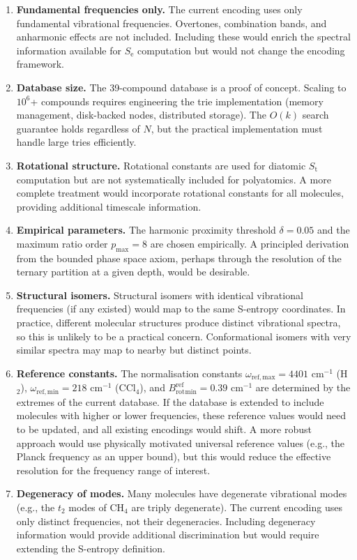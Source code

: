 \documentclass[11pt,twocolumn,a4paper]{article}
\theoremstyle{definition}
\theoremstyle{remark}
\newcommand{\St}{S_{\mathrm{t}}}
\newcommand{\Se}{S_{\mathrm{e}}}
\newcommand{\Brot}{B_{\mathrm{rot}}}
\begin{document}
\begin{enumerate}
\item \textbf{Fundamental frequencies only.} The current encoding uses only fundamental vibrational frequencies. Overtones, combination bands, and anharmonic effects are not included. Including these would enrich the spectral information available for $\Se$ computation but would not change the encoding framework.

\item \textbf{Database size.} The 39-compound database is a proof of concept. Scaling to $10^6$+ compounds requires engineering the trie implementation (memory management, disk-backed nodes, distributed storage). The $O(k)$ search guarantee holds regardless of $N$, but the practical implementation must handle large tries efficiently.

\item \textbf{Rotational structure.} Rotational constants are used for diatomic $\St$ computation but are not systematically included for polyatomics. A more complete treatment would incorporate rotational constants for all molecules, providing additional timescale information.

\item \textbf{Empirical parameters.} The harmonic proximity threshold $\delta = 0.05$ and the maximum ratio order $p_{\max} = 8$ are chosen empirically. A principled derivation from the bounded phase space axiom, perhaps through the resolution of the ternary partition at a given depth, would be desirable.

\item \textbf{Structural isomers.} Structural isomers with identical vibrational frequencies (if any existed) would map to the same S-entropy coordinates. In practice, different molecular structures produce distinct vibrational spectra, so this is unlikely to be a practical concern. Conformational isomers with very similar spectra may map to nearby but distinct points.

\item \textbf{Reference constants.} The normalisation constants $\omega_{\mathrm{ref,max}} = 4401$ cm$^{-1}$ (H$_2$), $\omega_{\mathrm{ref,min}} = 218$ cm$^{-1}$ (CCl$_4$), and $\Brot^{\mathrm{ref}}_{\mathrm{min}} = 0.39$ cm$^{-1}$ are determined by the extremes of the current database. If the database is extended to include molecules with higher or lower frequencies, these reference values would need to be updated, and all existing encodings would shift. A more robust approach would use physically motivated universal reference values (e.g., the Planck frequency as an upper bound), but this would reduce the effective resolution for the frequency range of interest.

\item \textbf{Degeneracy of modes.} Many molecules have degenerate vibrational modes (e.g., the $t_2$ modes of CH$_4$ are triply degenerate). The current encoding uses only distinct frequencies, not their degeneracies. Including degeneracy information would provide additional discrimination but would require extending the S-entropy definition.
\end{enumerate}
\end{document}
